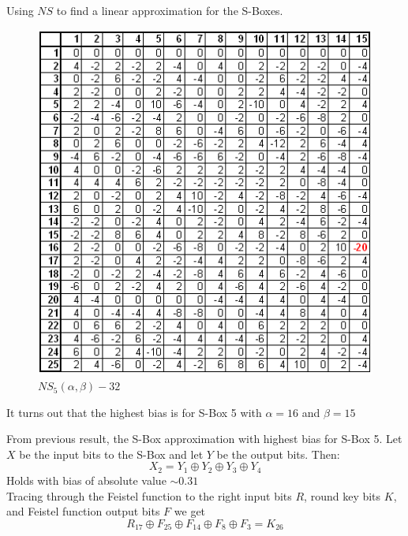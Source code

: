 \documentclass[9pt]{beamer}
\begin{document}
\begin{frame}
Using $NS$ to find a linear approximation for the S-Boxes.\\
\vspace{5mm}
\begin{figure}
\includegraphics[totalheight=0.7\textheight]{NS_S5.PNG}
\caption{$NS_5(\alpha, \beta) - 32$}
\end{figure}
It turns out that the highest bias is for S-Box 5 with $\alpha = 16$ and $\beta = 15$
\end{frame}

\begin{frame}
From previous result, the S-Box approximation with highest bias for S-Box 5. Let $X$ be the input bits to the S-Box and let $Y$ be the output bits. Then:
\[ X_{2} = Y_{1} \oplus Y_{2} \oplus Y_{3} \oplus Y_{4} \]
Holds with bias of absolute value $\sim 0.31$\\
\vspace{5mm}
Tracing through the Feistel function to the right input bits $R$, round key bits $K$, and Feistel function output bits $F$ we get
\[ R_{17} \oplus F_{25} \oplus F_{14} \oplus F_{8} \oplus F_{3} = K_{26} \]

\end{frame}
\end{document}
